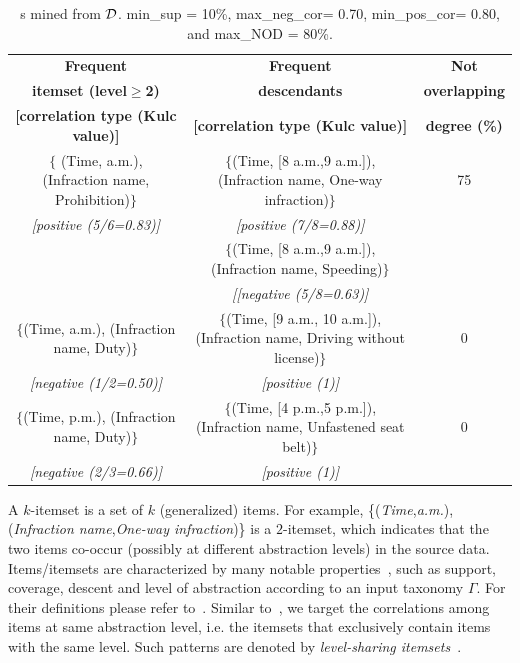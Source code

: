 \begin{table}[th!]
\scriptsize
\caption{\MGI{}s mined from $\cal{D}$. min\_sup = 10\%, max\_neg\_cor= 0.70, min\_pos\_cor= 0.80, and max\_NOD = 80\%.} \label{tab:exampleMGI}
\centering
\hspace{-1.5cm}
\begin{tabular}{|c|c|c|}
\hline 
 {\bf Frequent}       		& {\bf Frequent}                   & {\bf Not }    \\
 {\bf itemset (level$\geq$2)}    		& {\bf descendants}                 & {\bf overlapping} \\
 {\bf [correlation type (Kulc value)]}   	& {\bf [correlation type (Kulc value)]} &  {\bf degree (\%)}         \\
\hline
$\{$ (Time, a.m.), (Infraction name, Prohibition)$\}$    &   $\{$(Time, [8 a.m.,9 a.m.]), (Infraction name, One-way infraction)$\}$ & 75   \\
     \textit{[positive (5/6=0.83)]}       &    \textit{[positive (7/8=0.88)]}         &  \\
                                 &  $\{$(Time, [8 a.m.,9 a.m.]), (Infraction name, Speeding)$\}$    &  \\
                                 &    \textit{[[negative (5/8=0.63)]}              &  \\
\hline
 $\{$(Time, a.m.), (Infraction name, Duty)$\}$  &  $\{$(Time, [9 a.m., 10 a.m.]), (Infraction name, Driving without license)$\}$  & 0  \\
           \textit{[negative (1/2=0.50)]}                  & \textit{[positive (1)]} &  \\        
\hline
 $\{$(Time, p.m.), (Infraction name, Duty)$\}$  &  $\{$(Time, [4 p.m.,5 p.m.]), (Infraction name, Unfastened seat belt)$\}$  & 0   \\
           \textit{[negative (2/3=0.66)]}                  &  \textit{[positive (1)]} &  \\
\hline
\end{tabular}
\end{table}



A $k$-itemset is a set of $k$ (generalized) items. 
For example, \{(\textit{Time},\textit{a.m.}), (\textit{Infraction name},\textit{One-way infraction})\} is a $2$-itemset, 
which indicates that the two items co-occur (possibly at different abstraction levels) in the source data.  
Items/itemsets are characterized by many notable properties~\cite{Srikant1995}, such as support, coverage, descent and level of abstraction according to an input taxonomy $\Gamma$. 
For their definitions please refer to~\cite{Srikant1995,Han1999,MGI}. 
Similar to~\cite{Han1999,Flipping}, we target the correlations among items at same abstraction level, i.e. the itemsets that exclusively contain items with the same level. Such patterns are denoted by \textit{level-sharing itemsets}~\cite{Han1999}. 

